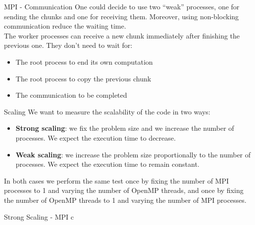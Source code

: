 \begin{frame}[fragile,t]{MPI - Communication}
    One could decide to use two \enquote{weak} processes, one
    for sending the chunks and one for receiving them. Moreover,
    using non-blocking communication reduce the waiting time. \\
    The worker processes can receive a new chunk immediately after
    finishing the previous one. They don't need to wait for:
    \begin{itemize}
        \item The root process to end its own computation
        \item The root process to copy the previous chunk
        \item The communication to be completed
    \end{itemize}
\end{frame}

%
%
\begin{frame}[fragile]{Scaling}
    We want to measure the scalability of the code in two ways:
    \begin{itemize}
        \item \textbf{Strong scaling}: we fix the problem size and
        we increase the number of processes. We expect the execution
        time to decrease.
        \item \textbf{Weak scaling}: we increase the problem size
        proportionally to the number of processes. We expect the
        execution time to remain constant.
    \end{itemize}
    In both cases we perform the same test once by fixing the number
    of MPI processes to 1 and varying the number of OpenMP threads,
    and once by fixing the number of OpenMP threads to 1 and varying
    the number of MPI processes.
\end{frame}

%
%
\begin{frame}[fragile]{Strong Scaling - MPI}
    c
\end{frame}



